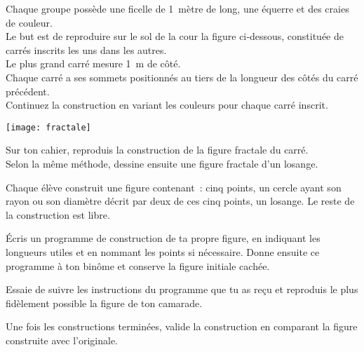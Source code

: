 
\begin{TP}[Fractale]


Chaque groupe possède une ficelle de 1 mètre de long, une équerre et des craies de couleur.\\[0.5em]
Le but est de reproduire sur le sol de la cour la figure ci‑dessous, constituée de carrés inscrits les uns dans les autres. \\[0.5em]
Le plus grand carré mesure 1 m de côté.\\[0.5em]
Chaque carré a ses sommets positionnés au tiers de la longueur des côtés du carré précédent.\\[0.5em]
Continuez la construction en variant les couleurs pour chaque carré inscrit.\\[0.5em]
\begin{center} \texttt{[image: fractale]} \end{center}


Sur ton cahier, reproduis la construction de la figure fractale du carré.\\[0.5em]
Selon la même méthode, dessine ensuite une figure fractale d'un losange.

\end{TP}


\begin{TP}

Chaque élève construit une figure contenant : cinq points, un cercle ayant son rayon ou son diamètre décrit par deux de ces cinq points, un losange. Le reste de la construction est libre.

Écris un programme de construction de ta propre figure, en indiquant les longueurs utiles et en nommant les points si nécessaire. Donne ensuite ce programme à ton binôme et conserve la figure initiale cachée.

Essaie de suivre les instructions du programme que tu as reçu et reproduis le plus fidèlement possible la figure de ton camarade.

Une fois les constructions terminées, valide la construction en comparant la figure construite avec l'originale.

\end{TP}

